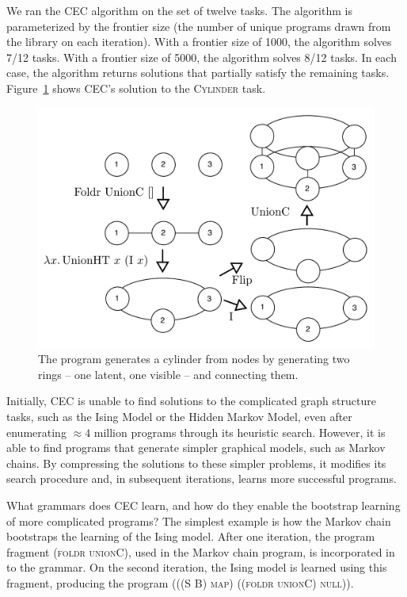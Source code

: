 \documentclass{article} %
\begin{document}
We ran the CEC algorithm on the set of twelve tasks. The algorithm is parameterized by the frontier size (the number of unique programs drawn from the library on each iteration). %
With a frontier size of 1000, the algorithm solves 7/12 tasks. With a frontier size of 5000, the algorithm solves 8/12 tasks. In each case, the algorithm returns solutions that partially satisfy the remaining tasks. Figure~\ref{ref:cylinder} shows CEC's solution to the \textsc{Cylinder} task. 
\begin{figure}
\includegraphics[width=\linewidth]{./figures/cylinder.pdf}
\caption{The program generates a cylinder from nodes by generating two rings -- one latent, one visible -- and connecting them.\label{ref:cylinder}}
\end{figure}
Initially, CEC is unable to find solutions to the complicated graph structure tasks, such as the Ising Model or the Hidden Markov Model, even after enumerating $\approx 4$ million programs through its heuristic search.
However, it is able to find programs that generate simpler graphical models, such as Markov chains.
By compressing the solutions to these simpler problems, it modifies its search procedure and, in subsequent iterations, learns more successful programs.

What grammars does CEC learn, and how do they enable the bootstrap learning of more complicated programs?
The simplest example is how the Markov chain bootstraps the learning of the Ising model.
After one iteration, the program fragment \textsc{(foldr unionC)}, used in the Markov chain program, is incorporated in to the grammar.
On the second iteration, the Ising model is learned using this fragment, producing the program
\textsc{(((S B) map) ((foldr unionC) null))}.
\end{document}
